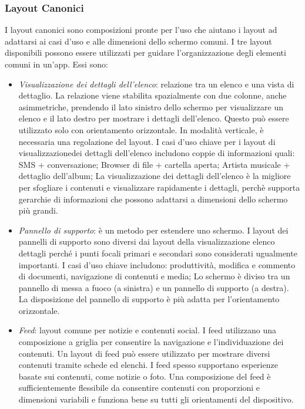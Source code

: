 \documentclass[12pt, a4paper]{report}
\begin{document}
		\subsubsection{Layout Canonici}
		I layout canonici sono composizioni pronte per l'uso che aiutano i layout ad adattarsi ai casi d'uso e alle dimensioni dello schermo comuni. I tre layout disponibili possono essere utilizzati per guidare l'organizzazione degli elementi comuni in un'app. Essi sono:
		\begin{itemize}
			\item \textit{Visualizzazione dei dettagli dell'elenco}: relazione tra un elenco e una vista di dettaglio. La relazione viene stabilita spazialmente con due colonne, anche asimmetriche, prendendo il lato sinistro dello schermo per visualizzare un elenco e il lato destro per mostrare i dettagli dell'elenco.
			Questo può essere utilizzato solo con orientamento orizzontale. In modalità verticale, è necessaria una regolazione del layout. I casi d'uso chiave per i layout di visualizzazionedei dettagli dell'elenco includono coppie di informazioni quali: SMS + conversazione; Browser di file + cartella aperta; Artista musicale + dettaglio dell'album;
			La visualizzazione dei dettagli dell'elenco è la migliore per sfogliare i contenuti e visualizzare rapidamente i dettagli, perchè supporta gerarchie di informazioni che possono adattarsi a dimensioni dello schermo più grandi.
			\item \textit{Pannello di supporto}: è un metodo per estendere uno schermo. I layout dei pannelli di supporto sono diversi dai layout della visualizzazione elenco dettagli perché i punti focali primari e secondari sono considerati ugualmente importanti. I casi d'uso chiave includono: produttività, modifica e commento di documenti, navigazione di contenuti e media;
			Lo schermo è diviso tra un pannello di messa a fuoco (a sinistra) e un pannello di supporto (a destra). La disposizione del pannello di supporto è più adatta per l'orientamento orizzontale.
			\item \textit{Feed}: layout comune per notizie e contenuti social. I feed utilizzano una composizione a griglia per consentire la navigazione e l'individuazione dei contenuti. Un layout di feed può essere utilizzato per mostrare diversi contenuti tramite schede ed elenchi.
			I feed spesso supportano esperienze basate sui contenuti, come notizie o foto. Una composizione del feed è sufficientemente flessibile da consentire contenuti con proporzioni e dimensioni variabili e funziona bene su tutti gli orientamenti del dispositivo.
		\end{itemize}
\end{document}
